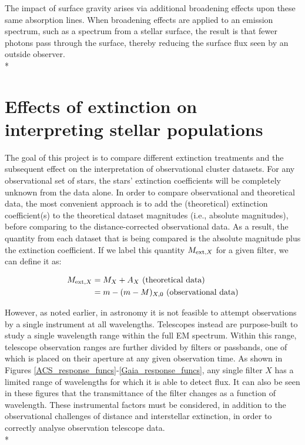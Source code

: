 \documentclass[12pt, a4paper]{report}
\begin{document}
The impact of surface gravity arises via additional broadening effects upon these same absorption lines. When broadening effects are applied to an emission spectrum, such as a spectrum from a stellar surface, the result is that fewer photons pass through the surface, thereby reducing the surface flux seen by an outside observer. \\*


\section{Effects of extinction on interpreting stellar populations} \label{extinc_desc}

The goal of this project is to compare different extinction treatments and the subsequent effect on the interpretation of observational cluster datasets. For any observational set of stars, the stars' extinction coefficients will be completely unknown from the data alone. In order to compare observational and theoretical  data, the most convenient approach is to add the (theoretical) extinction coefficient(s) to the theoretical dataset magnitudes (i.e., absolute magnitudes), before comparing to the distance-corrected observational data. As a result, the quantity from each dataset that is being compared is the absolute magnitude plus the extinction coefficient. If we label this quantity $M_{\textnormal{ext},X}$ for a given filter, we can define it as:

\begin{align}
\begin{split}
M_{\textnormal{ext},X} &= M_{X} + A_{X} \textnormal{ (theoretical data)}\\
 &= m - (m - M)_{X,0} \textnormal{ (observational data)}
\end{split}
\label{MextX_eq}
\end{align}


However, as noted earlier, in astronomy it is not feasible to attempt observations by a single instrument at all wavelengths. Telescopes instead are purpose-built to study a single wavelength range within the full EM spectrum. Within this range, telescope observation ranges are further divided by filters or passbands, one of which is placed on their aperture at any given observation time. As shown in Figures \ref{ACS_response_funcs}-\ref{Gaia_response_funcs}, any single filter $X$ has a limited range of wavelengths for which it is able to detect flux. It can also be seen in these figures that the transmittance of the filter changes as a function of wavelength. These instrumental factors must be considered, in addition to the observational challenges of distance and interstellar extinction, in order to correctly analyse observation telescope data. \\*
\end{document}
